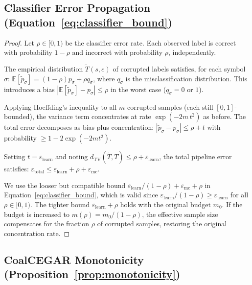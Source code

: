 \documentclass[11pt]{article}
\begin{document}
\subsection{Classifier Error Propagation (Equation~\ref{eq:classifier_bound})}
\label{app:classifier-proof}

\begin{proof}
Let $\rho \in [0, 1)$ be the classifier error rate.  Each observed
label is correct with probability $1-\rho$ and incorrect with
probability $\rho$, independently.

The empirical distribution $\tilde{T}(s,e)$ of corrupted labels
satisfies, for each symbol $\sigma$:
$\mathbb{E}[\tilde{p}_\sigma] = (1-\rho) p_\sigma + \rho q_\sigma$,
where $q_\sigma$ is the misclassification distribution.  This
introduces a bias $|\mathbb{E}[\tilde{p}_\sigma] - p_\sigma| \le \rho$
in the worst case ($q_\sigma = 0$ or $1$).

Applying Hoeffding's inequality to all $m$ corrupted samples
(each still $[0,1]$-bounded), the variance term concentrates at rate
$\exp(-2m\,t^2)$ as before.  The total error decomposes as
bias plus concentration:
$|\tilde{p}_\sigma - p_\sigma| \le \rho + t$ with probability
$\ge 1 - 2\exp(-2mt^2)$.

Setting $t = \varepsilon_{\mathrm{learn}}$ and noting
$d_{\mathrm{TV}}(\tilde{T}, T) \le \rho + \varepsilon_{\mathrm{learn}}$,
the total pipeline error satisfies:
$\varepsilon_{\mathrm{total}} \le
\varepsilon_{\mathrm{learn}} + \rho + \varepsilon_{\mathrm{mc}}$.

We use the looser but compatible bound
$\varepsilon_{\mathrm{learn}} / (1 - \rho) + \varepsilon_{\mathrm{mc}} + \rho$
in Equation~\ref{eq:classifier_bound}, which is valid since
$\varepsilon_{\mathrm{learn}} / (1-\rho) \ge \varepsilon_{\mathrm{learn}}$
for all $\rho \in [0,1)$.  The tighter bound
$\varepsilon_{\mathrm{learn}} + \rho$ holds with the original budget $m_0$.
If the budget is increased to $m(\rho) = m_0/(1-\rho)$, the
effective sample size compensates for the fraction $\rho$ of
corrupted samples, restoring the original concentration rate.
\end{proof}

\subsection{CoalCEGAR Monotonicity (Proposition~\ref{prop:monotonicity})}
\end{document}
